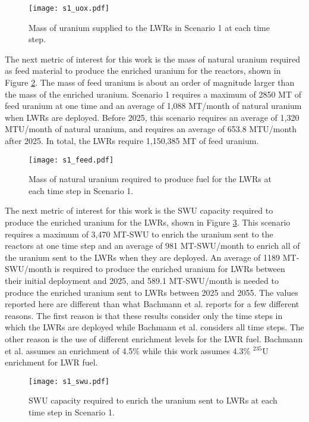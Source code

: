 \begin{figure}[h!]
    \centering
    \texttt{[image: s1\_uox.pdf]}
    \caption{Mass of uranium supplied to the LWRs in Scenario 1 at each time step.}
    \label{fig:fuel1}
\end{figure}

The next metric of interest for this work is the mass of natural uranium 
required as feed material to produce the enriched uranium for the 
reactors, shown in Figure \ref{fig:feed1}. The mass of feed uranium 
is about an order of magnitude larger than the mass of the enriched uranium. 
Scenario 1 requires a maximum of 2850 MT of 
feed uranium at one time and an average of 1,088 MT/month of natural uranium 
when \glspl{LWR} are deployed. Before 2025, this scenario requires an average of 
1,320 MTU/month of natural uranium, and requires an average of 653.8 MTU/month 
after 2025. In total, the \glspl{LWR} require 1,150,385 MT of feed uranium.

\begin{figure}[h!]
    \centering
    \texttt{[image: s1\_feed.pdf]}
    \caption{Mass of natural uranium required to produce fuel for the LWRs at each 
    time step in Scenario 1.}
    \label{fig:feed1}
\end{figure}

The next metric of interest for this work is the \gls{SWU} capacity required 
to produce the enriched uranium for the \glspl{LWR}, 
shown in Figure \ref{fig:swu1}. This scenario requires a maximum of 3,470 
MT-SWU to 
enrich the uranium sent to the reactors at one time step and an average of 
981 MT-SWU/month to enrich all of the uranium sent to 
the \glspl{LWR} when they are deployed. An average of 
1189 MT-SWU/month is required to produce the enriched uranium 
for \glspl{LWR} between their initial deployment and 2025, and 
589.1 MT-SWU/month is needed to produce the 
enriched uranium sent to \glspl{LWR} between 2025 and 2055. The values 
reported here are different than what Bachmann et al. \cite{bachmann_enrichment_2021}
reports for a few different reasons. The first reason is that these results  
consider only
the time steps in which the \glspl{LWR} are deployed while Bachmann et al. 
considers all time steps. The other reason
is the use of different enrichment levels for the \gls{LWR} fuel. 
Bachmann et al. assumes an enrichment of 4.5\% while this work assumes 4.3\%
$^{235}$U enrichment for \gls{LWR} fuel. 


\begin{figure}[h!]
    \centering
    \texttt{[image: s1\_swu.pdf]}
    \caption{SWU capacity required to enrich the uranium sent to LWRs at each time step in Scenario 1.}
    \label{fig:swu1}
\end{figure}

